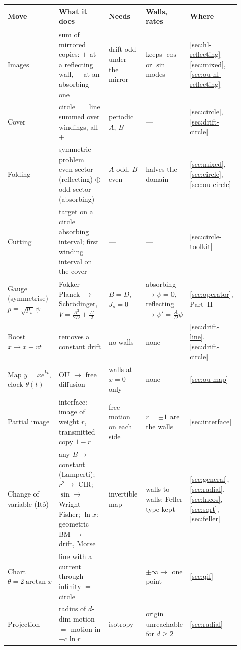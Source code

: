 \documentclass[11pt]{article}
\numberwithin{equation}{section}
\begin{document}
\begin{table}[tbp]
\centering
\footnotesize
\renewcommand{\arraystretch}{1.3}
\setlength{\tabcolsep}{3pt}
\begin{tabular}{@{}>{\raggedright}p{0.16\linewidth} >{\raggedright}p{0.26\linewidth} >{\raggedright}p{0.17\linewidth} >{\raggedright}p{0.19\linewidth} >{\raggedright\arraybackslash}p{0.13\linewidth}@{}}
\toprule
Move & What it does & Needs & Walls, rates & Where \\
\midrule
Images & sum of mirrored copies: $+$ at a reflecting wall, $-$ at an absorbing one & drift odd under the mirror & keeps $\cos$ or $\sin$ modes & \ref{sec:hl-reflecting}--\ref{sec:mixed}, \ref{sec:ou-hl-reflecting} \\
Cover & circle $=$ line summed over windings, all $+$ & periodic $A$, $B$ & --- & \ref{sec:circle}, \ref{sec:drift-circle} \\
Folding & symmetric problem $=$ even sector (reflecting) $\oplus$ odd sector (absorbing) & $A$ odd, $B$ even & halves the domain & \ref{sec:mixed}, \ref{sec:circle}, \ref{sec:ou-circle} \\
Cutting & target on a circle $=$ absorbing interval; first winding $=$ interval on the cover & --- & --- & \ref{sec:circle-toolkit} \\
Gauge (symmetrise) $p=\sqrt{p_s}\,\psi$ & Fokker--Planck $\to$ Schr\"odinger, $V=\frac{A^2}{2D}+\frac{A'}2$ & $B=D$, $J_s=0$ & absorbing $\to\psi=0$, reflecting $\to\psi'=\frac AD\psi$ & \ref{sec:operator}, Part~II \\
Boost $x\to x-vt$ & removes a constant drift & no walls & none & \ref{sec:drift-line}, \ref{sec:drift-circle} \\
Map $y=xe^{kt}$, clock $\theta(t)$ & OU $\to$ free diffusion & walls at $x=0$ only & none & \ref{sec:ou-map} \\
Partial image & interface: image of weight $r$, transmitted copy $1-r$ & free motion on each side & $r=\pm1$ are the walls & \ref{sec:interface} \\
Change of variable (Itô) & any $B\to$ constant (Lamperti); $r^2\to$ CIR; $\sin\to$ Wright--Fisher; $\ln x$: geometric BM $\to$ drift, Morse & invertible map & walls to walls; Feller type kept & \ref{sec:general}, \ref{sec:radial}, \ref{sec:lncos}, \ref{sec:sqrt}, \ref{sec:feller} \\
Chart $\theta=2\arctan x$ & line with a current through infinity $=$ circle & --- & $\pm\infty\to$ one point & \ref{sec:qif} \\
Projection & radius of $d$-dim motion $=$ motion in $-c\ln r$ & isotropy & origin unreachable for $d\ge2$ & \ref{sec:radial} \\

\end{tabular}
\end{table}
\end{document}
